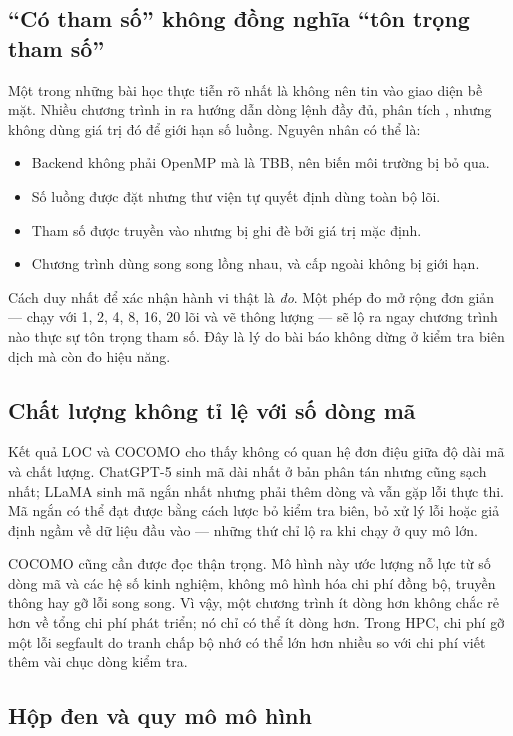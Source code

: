 \subsection{“Có tham số” không đồng nghĩa “tôn trọng tham số”}

Một trong những bài học thực tiễn rõ nhất là không nên tin vào giao diện bề mặt.
Nhiều chương trình in ra hướng dẫn dòng lệnh đầy đủ, phân tích , nhưng
không dùng giá trị đó để giới hạn số luồng. Nguyên nhân có thể là:

\begin{itemize}
  \item Backend không phải OpenMP mà là TBB, nên biến môi trường bị bỏ qua.
  \item Số luồng được đặt nhưng thư viện tự quyết định dùng toàn bộ lõi.
  \item Tham số được truyền vào nhưng bị ghi đè bởi giá trị mặc định.
  \item Chương trình dùng song song lồng nhau, và cấp ngoài không bị giới hạn.
\end{itemize}

Cách duy nhất để xác nhận hành vi thật là \emph{đo}. Một phép đo mở rộng đơn giản
— chạy với 1, 2, 4, 8, 16, 20 lõi và vẽ thông lượng — sẽ lộ ra ngay chương trình
nào thực sự tôn trọng tham số. Đây là lý do bài báo không dừng ở kiểm tra biên
dịch mà còn đo hiệu năng.

\subsection{Chất lượng không tỉ lệ với số dòng mã}

Kết quả LOC và COCOMO cho thấy không có quan hệ đơn điệu giữa độ dài mã và chất
lượng. ChatGPT-5 sinh mã dài nhất ở bản phân tán nhưng cũng sạch nhất; LLaMA sinh
mã ngắn nhất nhưng phải thêm dòng và vẫn gặp lỗi thực thi. Mã ngắn có thể đạt được
bằng cách lược bỏ kiểm tra biên, bỏ xử lý lỗi hoặc giả định ngầm về dữ liệu đầu
vào — những thứ chỉ lộ ra khi chạy ở quy mô lớn.

COCOMO cũng cần được đọc thận trọng. Mô hình này ước lượng nỗ lực từ số dòng mã
và các hệ số kinh nghiệm, không mô hình hóa chi phí đồng bộ, truyền thông hay gỡ
lỗi song song. Vì vậy, một chương trình ít dòng hơn không chắc rẻ hơn về tổng chi
phí phát triển; nó chỉ có thể ít dòng hơn. Trong HPC, chi phí gỡ một lỗi
segfault do tranh chấp bộ nhớ có thể lớn hơn nhiều so với chi phí viết thêm vài
chục dòng kiểm tra.

\subsection{Hộp đen và quy mô mô hình}

